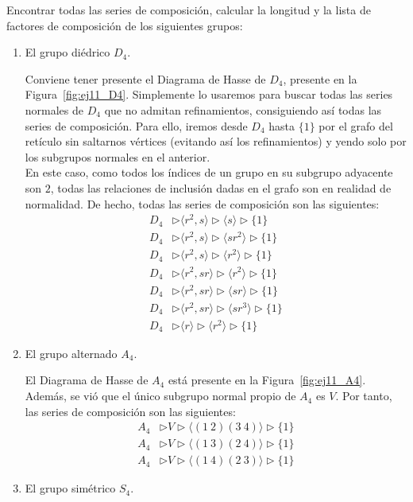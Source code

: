 \begin{ejercicio}
    Encontrar todas las series de composición, calcular la longitud y la lista de factores de composición de los siguientes grupos:
    \begin{enumerate}
        \item El grupo diédrico $D_4$.
        
        Conviene tener presente el Diagrama de Hasse de $D_4$, presente en la Figura~\ref{fig:ej11_D4}. Simplemente lo usaremos para buscar todas las series normales de $D_4$ que no admitan refinamientos, consiguiendo así todas las series de composición. Para ello, iremos desde $D_4$ hasta $\{1\}$ por el grafo del retículo sin saltarnos vértices (evitando así los refinamientos) y yendo solo por los subgrupos normales en el anterior.\\

        En este caso, como todos los índices de un grupo en su subgrupo adyacente son $2$, todas las relaciones de inclusión dadas en el grafo son en realidad de normalidad. De hecho, todas las series de composición son las siguientes:
        \begin{align*}
            D_4 &\rhd \langle r^2, s \rangle \rhd  \langle s \rangle  \rhd \{1\} \\
            D_4 &\rhd \langle r^2, s \rangle \rhd \langle sr^2 \rangle  \rhd \{1\} \\
            D_4 &\rhd \langle r^2, s \rangle \rhd \langle r^2 \rangle  \rhd \{1\} \\
            D_4 &\rhd \langle r^2, sr \rangle  \rhd \langle r^2 \rangle  \rhd \{1\} \\
            D_4 &\rhd \langle r^2, sr \rangle  \rhd \langle sr \rangle  \rhd \{1\} \\
            D_4 &\rhd \langle r^2, sr \rangle  \rhd \langle sr^3 \rangle  \rhd \{1\} \\
            D_4 &\rhd \langle r \rangle \rhd \langle r^2 \rangle  \rhd \{1\}
        \end{align*}
        \item El grupo alternado $A_4$.
        
        El Diagrama de Hasse de $A_4$ está presente en la Figura~\ref{fig:ej11_A4}. Además, se vió que el único subgrupo normal propio de $A_4$ es $V$. Por tanto, las series de composición son las siguientes:
        \begin{align*}
            A_4 &\rhd V \rhd \langle (1\ 2)(3\ 4) \rangle  \rhd \{1\} \\
            A_4 &\rhd V \rhd \langle (1\ 3)(2\ 4) \rangle  \rhd \{1\} \\
            A_4 &\rhd V \rhd \langle (1\ 4)(2\ 3) \rangle  \rhd \{1\}
        \end{align*}
        \item El grupo simétrico $S_4$.
        

\end{enumerate}
\end{ejercicio}
